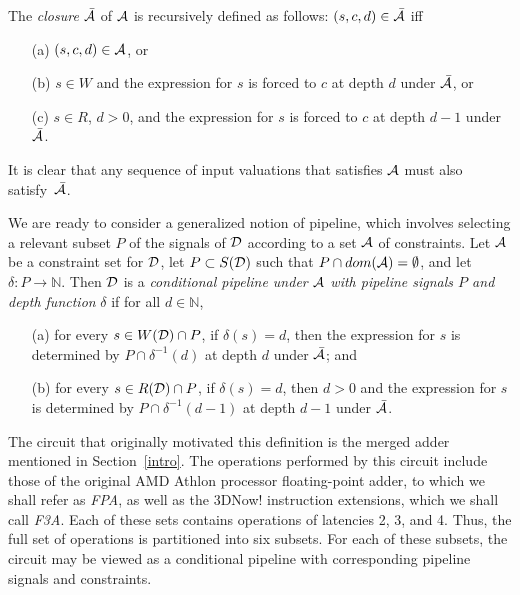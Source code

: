 \documentclass{article}
\begin{document}
The {\it closure} $\bar{\cal A}$ of ${\cal A}$ is recursively defined
as follows: $(s,c,d) \in \bar{\cal A}$ iff

\begin{itemize}

\item[(a)] $(s,c,d) \in {\cal A}$, or

\item[(b)] $s \in W$ and the expression for $s$ is forced to $c$ at
depth $d$ under $\bar{\cal A}$, or

\item[(c)] $s \in R$, $d > 0$,  and the expression for $s$ is forced to $c$ at
depth $d-1$ under~$\bar{\cal A}$.

\end{itemize}
It is clear that any sequence of input valuations that satisfies
${\cal A}$ must also satisfy~$\bar{\cal A}$.

We are ready to consider a generalized notion of pipeline, which involves
selecting a relevant subset $P$ of the signals of ${\cal D}$ according to a set
${\cal A}$ of constraints.  Let ${\cal A}$ be a constraint set for ${\cal D}$,
let $P \subset S({\cal D})$ such that $P \cap dom({\cal A}) = \emptyset$, and
let $\delta : P \rightarrow {\mathbb N}$.  Then ${\cal D}$ is a {\it
conditional pipeline under ${\cal A}$ with pipeline signals $P$ and depth
function} $\delta$ if for all $d \in {\mathbb N}$,

\begin{itemize}

\item[(a)] for every $s \in W({\cal D}) \cap P$, if $\delta(s) = d$,
then the expression for $s$ is determined by $P \cap \delta^{-1}(d)$
at depth $d$ under $\bar{\cal A}$; and

\item[(b)] for every $s \in R({\cal D}) \cap P$, if $\delta(s) = d$,
then $d > 0$ and the expression for $s$ is determined by $P \cap
\delta^{-1}(d-1)$ at depth $d-1$ under $\bar{\cal A}$.

\end{itemize}

The circuit that originally motivated this definition is the merged
adder mentioned in Section~\ref{intro}.  The operations performed by
this circuit include those of the original AMD Athlon processor
floating-point adder, to which we shall refer as {\it FPA}, as well as
the 3DNow! instruction extensions, which we shall call {\it F3A}.
Each of these sets contains operations of latencies 2, 3, and 4.
Thus, the full set of operations is partitioned into six subsets.  For
each of these subsets, the circuit may be viewed as a conditional
pipeline with corresponding pipeline signals and constraints.
\end{document}
